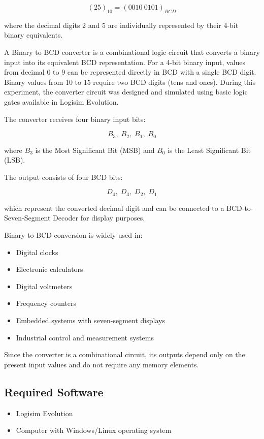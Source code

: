 \documentclass[12pt,a4paper]{article}
\begin{document}
\[
(25)_{10}=(0010\ 0101)_{BCD}
\]

where the decimal digits 2 and 5 are individually represented by their 4-bit binary equivalents.

A Binary to BCD converter is a combinational logic circuit that converts a binary input into its equivalent BCD representation. For a 4-bit binary input, values from decimal 0 to 9 can be represented directly in BCD with a single BCD digit. Binary values from 10 to 15 require two BCD digits (tens and ones). During this experiment, the converter circuit was designed and simulated using basic logic gates available in Logisim Evolution.

The converter receives four binary input bits:

\[
B_3,\;B_2,\;B_1,\;B_0
\]

where $B_3$ is the Most Significant Bit (MSB) and $B_0$ is the Least Significant Bit (LSB).

The output consists of four BCD bits:

\[
D_4,\;D_3,\;D_2,\;D_1
\]

which represent the converted decimal digit and can be connected to a BCD-to-Seven-Segment Decoder for display purposes.

Binary to BCD conversion is widely used in:

\begin{itemize}
    \item Digital clocks
    \item Electronic calculators
    \item Digital voltmeters
    \item Frequency counters
    \item Embedded systems with seven-segment displays
    \item Industrial control and measurement systems
\end{itemize}

Since the converter is a combinational circuit, its outputs depend only on the present input values and do not require any memory elements.

\subsection{Required Software}

\begin{itemize}
    \item Logisim Evolution
    \item Computer with Windows/Linux operating system
\end{itemize}
\end{document}
